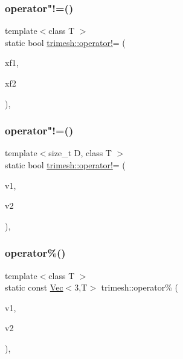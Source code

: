 \subsubsection{\texorpdfstring{operator"!=()}{operator!=()}\hspace{0.1cm}{\footnotesize\ttfamily [2/3]}}
{\footnotesize\ttfamily template$<$class T $>$ \\
static bool \hyperlink{namespacetrimesh_af767195cb37f08a930059365eb736329}{trimesh\+::operator!}= (\begin{DoxyParamCaption}\item[{const \hyperlink{classtrimesh_1_1XForm}{X\+Form}$<$ T $>$ \&}]{xf1,  }\item[{const \hyperlink{classtrimesh_1_1XForm}{X\+Form}$<$ T $>$ \&}]{xf2 }\end{DoxyParamCaption})\hspace{0.3cm}{\ttfamily [inline]}, {\ttfamily [static]}}

\mbox{\label{namespacetrimesh_a814e6a0f8e45dcbef63cd0ec2ddef1ff}} 
\subsubsection{\texorpdfstring{operator"!=()}{operator!=()}\hspace{0.1cm}{\footnotesize\ttfamily [3/3]}}
{\footnotesize\ttfamily template$<$size\+\_\+t D, class T $>$ \\
static bool \hyperlink{namespacetrimesh_af767195cb37f08a930059365eb736329}{trimesh\+::operator!}= (\begin{DoxyParamCaption}\item[{const \hyperlink{classtrimesh_1_1Vec}{Vec}$<$ D, T $>$ \&}]{v1,  }\item[{const \hyperlink{classtrimesh_1_1Vec}{Vec}$<$ D, T $>$ \&}]{v2 }\end{DoxyParamCaption})\hspace{0.3cm}{\ttfamily [inline]}, {\ttfamily [static]}}

\mbox{\label{namespacetrimesh_ab15dfdb74d75baef2c04d9d6db29c974}} 
\subsubsection{\texorpdfstring{operator\%()}{operator\%()}}
{\footnotesize\ttfamily template$<$class T $>$ \\
static const \hyperlink{classtrimesh_1_1Vec}{Vec}$<$3,T$>$ trimesh\+::operator\% (\begin{DoxyParamCaption}\item[{const \hyperlink{classtrimesh_1_1Vec}{Vec}$<$ 3, T $>$ \&}]{v1,  }\item[{const \hyperlink{classtrimesh_1_1Vec}{Vec}$<$ 3, T $>$ \&}]{v2 }\end{DoxyParamCaption})\hspace{0.3cm}{\ttfamily [inline]}, {\ttfamily [static]}}

